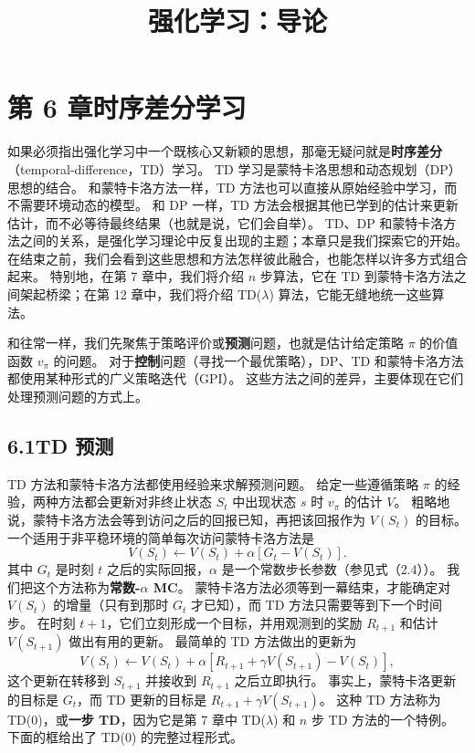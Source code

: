\documentclass[UTF8,12pt,a4paper,fontset=fandol]{ctexart}
\title{强化学习：导论}
\author{}
\date{}
\begin{document}
\maketitle

\section*{第 6 章\quad 时序差分学习}

如果必须指出强化学习中一个既核心又新颖的思想，那毫无疑问就是\textbf{时序差分}（temporal-difference，TD）学习。
TD 学习是蒙特卡洛思想和动态规划（DP）思想的结合。
和蒙特卡洛方法一样，TD 方法也可以直接从原始经验中学习，而不需要环境动态的模型。
和 DP 一样，TD 方法会根据其他已学到的估计来更新估计，而不必等待最终结果（也就是说，它们会自举）。
TD、DP 和蒙特卡洛方法之间的关系，是强化学习理论中反复出现的主题；本章只是我们探索它的开始。
在结束之前，我们会看到这些思想和方法怎样彼此融合，也能怎样以许多方式组合起来。
特别地，在第 7 章中，我们将介绍 $n$ 步算法，它在 TD 到蒙特卡洛方法之间架起桥梁；在第 12 章中，我们将介绍 TD($\lambda$) 算法，它能无缝地统一这些算法。

和往常一样，我们先聚焦于策略评价或\textbf{预测}问题，也就是估计给定策略 $\pi$ 的价值函数 $v_\pi$ 的问题。
对于\textbf{控制}问题（寻找一个最优策略），DP、TD 和蒙特卡洛方法都使用某种形式的广义策略迭代（GPI）。
这些方法之间的差异，主要体现在它们处理预测问题的方式上。

\subsection*{6.1\quad TD 预测}

TD 方法和蒙特卡洛方法都使用经验来求解预测问题。
给定一些遵循策略 $\pi$ 的经验，两种方法都会更新对非终止状态 $S_t$ 中出现状态 $s$ 时 $v_\pi$ 的估计 $V$。
粗略地说，蒙特卡洛方法会等到访问之后的回报已知，再把该回报作为 $V(S_t)$ 的目标。
一个适用于非平稳环境的简单每次访问蒙特卡洛方法是
\begin{equation}
V(S_t)\leftarrow V(S_t)+\alpha\left[G_t-V(S_t)\right].
\end{equation}
其中 $G_t$ 是时刻 $t$ 之后的实际回报，$\alpha$ 是一个常数步长参数（参见式（2.4））。
我们把这个方法称为\textbf{常数-$\alpha$ MC}。
蒙特卡洛方法必须等到一幕结束，才能确定对 $V(S_t)$ 的增量（只有到那时 $G_t$ 才已知），而 TD 方法只需要等到下一个时间步。
在时刻 $t+1$，它们立刻形成一个目标，并用观测到的奖励 $R_{t+1}$ 和估计 $V(S_{t+1})$ 做出有用的更新。
最简单的 TD 方法做出的更新为
\begin{equation}
V(S_t)\leftarrow V(S_t)+\alpha\left[R_{t+1}+\gamma V(S_{t+1})-V(S_t)\right],
\end{equation}
这个更新在转移到 $S_{t+1}$ 并接收到 $R_{t+1}$ 之后立即执行。
事实上，蒙特卡洛更新的目标是 $G_t$，而 TD 更新的目标是 $R_{t+1}+\gamma V(S_{t+1})$。
这种 TD 方法称为 TD(0)，或\textbf{一步 TD}，因为它是第 7 章中 TD($\lambda$) 和 $n$ 步 TD 方法的一个特例。
下面的框给出了 TD(0) 的完整过程形式。
\end{document}
